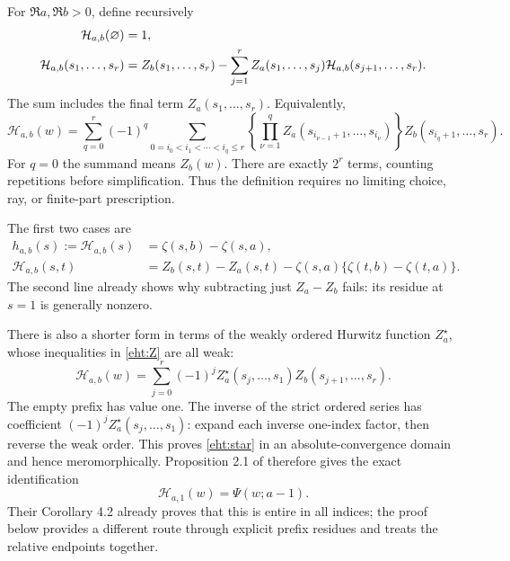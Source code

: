 \documentclass[11pt]{article}
\numberwithin{equation}{section}
\theoremstyle{plain}
\theoremstyle{definition}
\theoremstyle{remark}
\begin{document}
For $\Re a,\Re b>0$, define recursively
\begin{align}
 \mathcal H_{a,b}(\varnothing)&=1,\notag\\
 \mathcal H_{a,b}(s_1,\ldots,s_r)
 &=Z_b(s_1,\ldots,s_r)
   -\sum_{j=1}^rZ_a(s_1,\ldots,s_j)
                    \mathcal H_{a,b}(s_{j+1},\ldots,s_r).
 \label{eht:rec}
\end{align}
The sum includes the final term $Z_a(s_1,\ldots,s_r)$.  Equivalently,
\begin{equation}\label{eht:finite}
 \mathcal H_{a,b}(w)=
 \sum_{q=0}^r(-1)^q
 \sum_{0=i_0<i_1<\cdots<i_q\le r}
 \left\{\prod_{\nu=1}^q
   Z_a(s_{i_{\nu-1}+1},\ldots,s_{i_\nu})\right\}
 Z_b(s_{i_q+1},\ldots,s_r).
\end{equation}
For $q=0$ the summand means $Z_b(w)$.  There are exactly $2^r$ terms,
counting repetitions before simplification.  Thus the definition requires
no limiting choice, ray, or finite-part prescription.

The first two cases are
\begin{align}
 h_{a,b}(s):=\mathcal H_{a,b}(s)
   &=\zeta(s,b)-\zeta(s,a),\label{eht:h}\\
 \mathcal H_{a,b}(s,t)
   &=Z_b(s,t)-Z_a(s,t)-\zeta(s,a)
                         \{\zeta(t,b)-\zeta(t,a)\}.
 \label{eht:depthtwo}
\end{align}
The second line already shows why subtracting just $Z_a-Z_b$ fails:
its residue at $s=1$ is generally nonzero.

There is also a shorter form in terms of the weakly ordered Hurwitz
function $Z_a^\star$, whose inequalities in \eqref{eht:Z} are all weak:
\begin{equation}\label{eht:star}
 \mathcal H_{a,b}(w)=\sum_{j=0}^r(-1)^j
       Z_a^\star(s_j,\ldots,s_1)Z_b(s_{j+1},\ldots,s_r).
\end{equation}
The empty prefix has value one.  The inverse of the strict ordered series
has coefficient $(-1)^jZ_a^\star(s_j,\ldots,s_1)$: expand each inverse
one-index factor, then reverse the weak order.  This proves
\eqref{eht:star} in an absolute-convergence domain and hence meromorphically.
Proposition 2.1 of \cite{eht:INY} therefore gives the exact identification
\begin{equation}\label{eht:INY}
                 \mathcal H_{a,1}(w)=\Psi(w;a-1).
\end{equation}
Their Corollary 4.2 already proves that this is entire in all indices;
the proof below provides a different route through explicit prefix
residues and treats the relative endpoints together.
\end{document}
